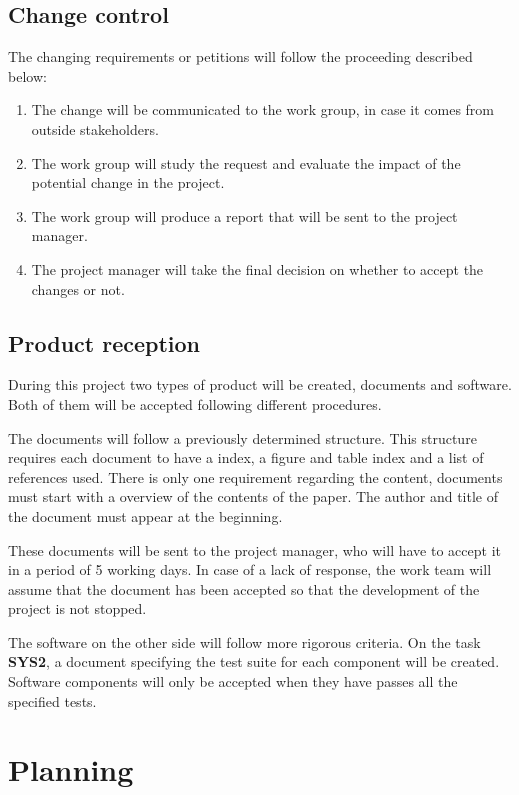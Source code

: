 \subsection{Change control}

The changing requirements or petitions will follow the proceeding described below:

\begin{enumerate}
\item The change will be communicated to the work group, in case it comes from outside stakeholders.
\item The work group will study the request and evaluate the impact of the potential change in the project.
\item The work group will produce a report that will be sent to the project manager.
\item The project manager will take the final decision on whether to accept the changes or not.
\end{enumerate}

\subsection{Product reception}

During this project two types of product will be created, documents and software. Both of them will be accepted following different procedures.

The documents will follow a previously determined structure. This structure requires each document to have a index, a figure and table index and a list of references used. There is only one requirement regarding the content, documents must start with a overview of the contents of the paper. The author and title of the document must appear at the beginning.

These documents will be sent to the project manager, who will have to accept it in a period of 5 working days. In case of a lack of response, the work team will assume that the document has been accepted so that the development of the project is not stopped.

The software on the other side will follow more rigorous criteria. On the task \textbf{SYS2}, a document specifying the test suite for each component will be created. Software components will only be accepted when they have passes all the specified tests.

\newpage
\FloatBarrier
\section{Planning}


